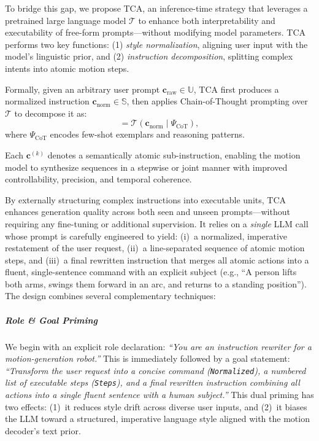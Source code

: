 \documentclass[a4paper,12pt]{article}
\begin{document}
To bridge this gap, we propose TCA, an inference-time strategy that leverages a pretrained large language model \( \mathcal{T} \) to enhance both interpretability and executability of free-form prompts—without modifying model parameters. TCA performs two key functions: (1) \textit{style normalization}, aligning user input with the model’s linguistic prior, and (2) \textit{instruction decomposition}, splitting complex intents into atomic motion steps.

Formally, given an arbitrary user prompt \( \mathbf{c}_{\text{raw}} \in \mathbb{U} \), TCA first produces a normalized instruction \( \mathbf{c}_{\text{norm}} \in \mathbb{S} \), then applies Chain-of-Thought prompting over \( \mathcal{T} \) to decompose it as:
\begin{equation}
[\mathbf{c}^{(1)}, \mathbf{c}^{(2)}, \ldots, \mathbf{c}^{(K)}] = \mathcal{T}(\mathbf{c}_{\text{norm}} \mid \Psi_{\text{CoT}}),
\end{equation}
where \( \Psi_{\text{CoT}} \) encodes few-shot exemplars and reasoning patterns.

Each \( \mathbf{c}^{(k)} \) denotes a semantically atomic sub-instruction, enabling the motion model to synthesize sequences in a stepwise or joint manner with improved controllability, precision, and temporal coherence.

By externally structuring complex instructions into executable units, TCA enhances generation quality across both seen and unseen prompts—without requiring any fine-tuning or additional supervision. It relies on a \emph{single} LLM call whose prompt is carefully engineered to yield:
(i)~a normalized, imperative restatement of the user request,
(ii)~a line-separated sequence of atomic motion steps, and
(iii)~a final rewritten instruction that merges all atomic actions into a
fluent, single-sentence command with an explicit subject
(e.g., ``A person lifts both arms, swings them forward in an arc, and returns to a standing position'').
The design combines several complementary techniques:

\subparagraph{Role \& Goal Priming} We begin with an explicit role declaration: \emph{``You are an instruction rewriter for a motion-generation robot.''} This is immediately followed by a goal statement: \emph{``Transform the user request into a concise command (\texttt{Normalized}), a numbered list of executable steps (\texttt{Steps}), and a final rewritten instruction combining all actions into a single fluent sentence with a human subject.''} This dual priming has two effects: (1)~it reduces style drift across diverse user inputs, and (2)~it biases the LLM toward a structured, imperative language style aligned with the motion decoder's text prior.
\end{document}
